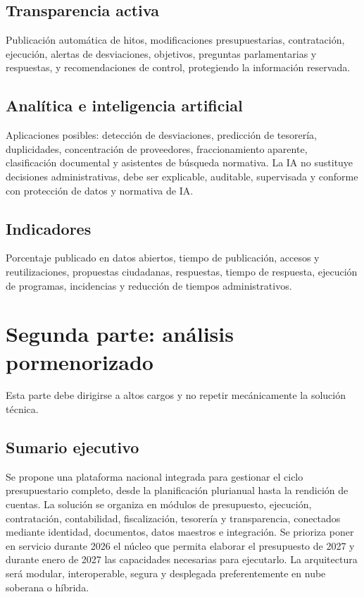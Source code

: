 \documentclass[11pt,a4paper]{article}
\begin{document}
\subsection{Transparencia activa}
Publicación automática de hitos, modificaciones presupuestarias, contratación, ejecución, alertas de desviaciones, objetivos, preguntas parlamentarias y respuestas, y recomendaciones de control, protegiendo la información reservada.

\subsection{Analítica e inteligencia artificial}
Aplicaciones posibles: detección de desviaciones, predicción de tesorería, duplicidades, concentración de proveedores, fraccionamiento aparente, clasificación documental y asistentes de búsqueda normativa. La IA no sustituye decisiones administrativas, debe ser explicable, auditable, supervisada y conforme con protección de datos y normativa de IA.

\subsection{Indicadores}
Porcentaje publicado en datos abiertos, tiempo de publicación, accesos y reutilizaciones, propuestas ciudadanas, respuestas, tiempo de respuesta, ejecución de programas, incidencias y reducción de tiempos administrativos.

\section{Segunda parte: análisis pormenorizado}

Esta parte debe dirigirse a altos cargos y no repetir mecánicamente la solución técnica.

\subsection{Sumario ejecutivo}

Se propone una plataforma nacional integrada para gestionar el ciclo presupuestario completo, desde la planificación plurianual hasta la rendición de cuentas. La solución se organiza en módulos de presupuesto, ejecución, contratación, contabilidad, fiscalización, tesorería y transparencia, conectados mediante identidad, documentos, datos maestros e integración. Se prioriza poner en servicio durante 2026 el núcleo que permita elaborar el presupuesto de 2027 y durante enero de 2027 las capacidades necesarias para ejecutarlo. La arquitectura será modular, interoperable, segura y desplegada preferentemente en nube soberana o híbrida.
\end{document}
